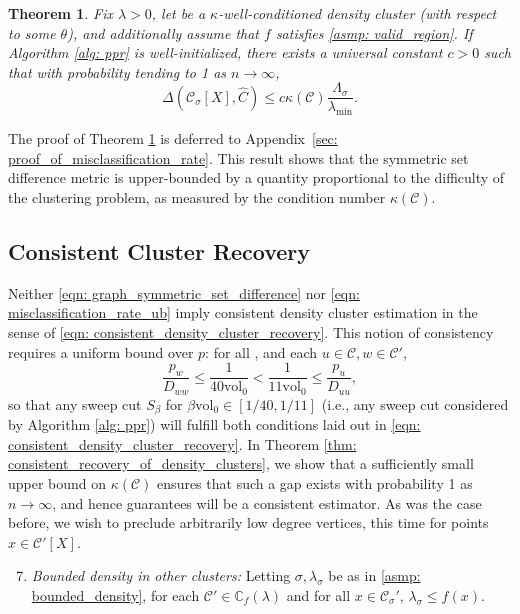 \documentclass[11pt,twoside]{article}
\newtheorem{theorem}{Theorem}
\newcommand{\vol}{\mathrm{vol}}
\newcommand{\1}{\mathbf{1}}
\newcommand{\pbf}{p}        %
\newcommand{\Xbf}{X}             %
\newcommand{\Dbf}{D}
\newcommand{\Cbb}{\mathbb{C}}
\newcommand{\Cset}{\mathcal{C}}
\newcommand{\Csig}{\Cset_{\sigma}}
\newcommand{\Cest}{\widehat{C}}
\begin{document}
\begin{theorem}
  \label{thm: misclassification_rate}
  Fix $\lambda > 0$, let \smash{$\Cset \in \Cbb_f(\lambda)$} be a
  $\kappa$-well-conditioned density cluster (with respect to some $\theta$), and
  additionally assume that $f$ satisfies \ref{asmp: valid_region}. If Algorithm
  \ref{alg: ppr} is well-initialized, there exists a universal constant $c >
  0$ such that with probability tending to 1 as $n \to \infty$,  
  \begin{equation}
    \label{eqn: misclassification_rate_ub}
    \Delta(\Csig[\Xbf], \Cest) \leq c \kappa(\Cset)
    \frac{\Lambda_{\sigma}}{\lambda_{\min}}. 
  \end{equation}
\end{theorem}
The proof of Theorem \ref{thm: misclassification_rate} is deferred to Appendix~\ref{sec: proof_of_misclassification_rate}.
This result shows that the symmetric set difference metric \smash{$\Delta(\Csig[\Xbf],
  \Cest)$} is upper-bounded by a quantity proportional to the difficulty of the clustering problem, as
measured by the condition number $\kappa(\Cset)$.

\subsection{Consistent Cluster Recovery}
Neither \eqref{eqn: graph_symmetric_set_difference} nor \eqref{eqn:
  misclassification_rate_ub} imply consistent density cluster estimation in the 
sense of \eqref{eqn: consistent_density_cluster_recovery}. This notion of
consistency requires a uniform bound over $\pbf$: for all \smash{$\Cset'
  \in \Cbb_f(\lambda), \Cset' \neq \Cset$}, and each $u \in \Cset, w \in
\Cset'$,  
\begin{equation}
\label{eqn: ppr_gap}
\frac{p_{w}}{\Dbf_{ww}} \leq \frac{1}{40\vol_0} < \frac{1}{11\vol_0} \leq
\frac{p_u}{\Dbf_{uu}}, 
\end{equation}
so that any sweep cut $S_{\beta}$ for $\beta \vol_0 \in [1/40,1/11]$ (i.e., any
sweep cut considered by Algorithm \ref{alg: ppr}) will fulfill both conditions
laid out in \eqref{eqn: consistent_density_cluster_recovery}. In Theorem
\ref{thm: consistent_recovery_of_density_clusters}, we show that a sufficiently
small upper bound on $\kappa(\Cset)$ ensures that such a gap exists with probability
1 as $n \to \infty$, and hence guarantees \smash{$\Cest$} will be a consistent  
estimator. As was the case before, we wish to preclude arbitrarily low degree
vertices, this time for points $x \in \Cset'[\Xbf]$. 
\begin{enumerate}[label=(A\arabic*)]
  \setcounter{enumi}{6}
\item 
  \label{asmp: C'_bounded_density}
  \emph{Bounded density in other clusters:} Letting $\sigma,\lambda_{\sigma}$ be 
  as in \ref{asmp: bounded_density}, for each $\Cset' \in \Cbb_f(\lambda)$ and
  for all $x \in \Csig'$, $\lambda_{\sigma} \leq f(x)$. 
\end{enumerate}
\end{document}
